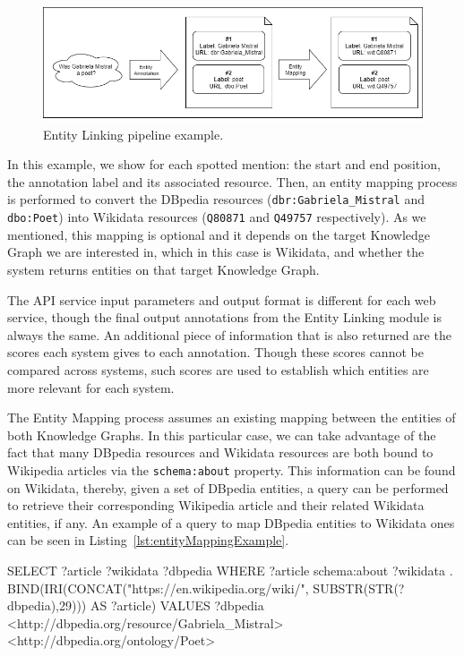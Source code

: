 \begin{figure}[!h]
    \centering
    \includegraphics[scale=.5]{imagenes/3_system_overview/individualEntityLinkingPipeline.png}
    \caption{Entity Linking pipeline example.}
    \label{fig:entityLinkingPipeline}
\end{figure}

In this example, we show for each spotted mention: the start and end position, the annotation 
label and its associated resource. Then, an entity mapping process is performed to convert 
the DBpedia resources (\texttt{dbr:Gabriela\_Mistral} and \texttt{dbo:Poet}) into Wikidata 
resources (\texttt{Q80871} and \texttt{Q49757} respectively). As we mentioned, this 
mapping is optional and it depends on the target Knowledge Graph we are interested in, which 
in this case is Wikidata, and whether the system returns entities on that target Knowledge 
Graph.

The API service input parameters and output format is different for each web service, though 
the final output annotations from the Entity Linking module is always the same. An additional 
piece of information that is also returned are the scores each system gives to each annotation. 
Though these scores cannot be compared across systems, such scores are used to establish 
which entities are more relevant for each system. 

The Entity Mapping process assumes an existing mapping between the entities of both Knowledge 
Graphs. In this particular case, we can take advantage of the fact that many DBpedia resources 
and Wikidata resources are both bound to Wikipedia articles via the \texttt{schema:about} property. 
This information can be found on Wikidata, thereby, given a set of DBpedia entities, a \SPARQL{} 
query can be performed to retrieve their corresponding Wikipedia article and their related 
Wikidata entities, if any. An example of a \SPARQL{} query to map DBpedia entities to Wikidata 
ones can be seen in Listing~\ref{lst:entityMappingExample}.

\begin{sparqlcode}[%
    caption={\SPARQL{} query example to map DBpedia resources to Wikidata ones.}, 
    label={lst:entityMappingExample}]
SELECT ?article ?wikidata ?dbpedia WHERE {
    ?article schema:about ?wikidata .
    BIND(IRI(CONCAT("https://en.wikipedia.org/wiki/", SUBSTR(STR(?dbpedia),29))) AS ?article)
    VALUES ?dbpedia { <http://dbpedia.org/resource/Gabriela_Mistral> <http://dbpedia.org/ontology/Poet> }
}
\end{sparqlcode}

